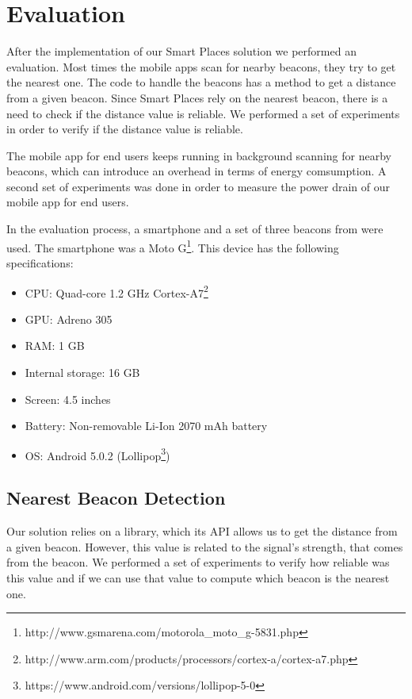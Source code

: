 
\section{Evaluation}
\label{sec:evaluation}
After the implementation of our Smart Places solution we performed an evaluation.
Most times the mobile apps scan for nearby beacons, they try to get the nearest one.
The code to handle the beacons has a method to get a distance from a given beacon.
Since Smart Places rely on the nearest beacon, there is a need to check if the distance value is reliable.
We performed a set of experiments in order to verify if the distance value is reliable.

The mobile app for end users keeps running in background scanning for nearby beacons, which can introduce an overhead in terms of energy comsumption.
A second set of experiments was done in order to measure the power drain of our mobile app for end users.

In the evaluation process, a smartphone and a set of three beacons from  were used.
The smartphone was a 
Moto G\footnote{http://www.gsmarena.com/motorola\_moto\_g-5831.php}.
This device has the following specifications:
\begin{itemize}
  \item \gls{CPU}: Quad-core 1.2 GHz Cortex-A7\footnote{http://www.arm.com/products/processors/cortex-a/cortex-a7.php}
  \item \gls{GPU}: Adreno 305
  \item \gls{RAM}: 1 \gls{GB}
  \item Internal storage: 16 \gls{GB}
  \item Screen: 4.5 inches
  \item Battery: Non-removable Li-Ion 2070 \gls{mAh} battery
  \item \gls{OS}: Android 5.0.2 (Lollipop\footnote{https://www.android.com/versions/lollipop-5-0})
\end{itemize}

\subsection{Nearest Beacon Detection}
\label{sec:evaluation_nearest_beacon}
Our solution relies on a library, which its \gls{API} allows us to get the distance from a given beacon.
However, this value is related to the signal's strength, that comes from the beacon.
We performed a set of experiments to verify how reliable was this value and if we can use that value to compute which beacon is the nearest one.

